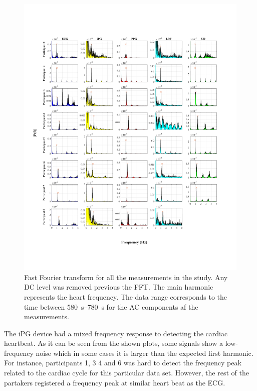 \begin{figure}[!htpb]
	\includegraphics[width=1\textwidth,keepaspectratio,trim={0.75cm 0cm 2cm 2cm},clip]{figure1}    
	\caption[Fequency components of the signals acquired]{Fast Fourier transform for all the measurements in the study. Any DC level was removed previous the FFT. The main harmonic represents the heart frequency. The data range corresponds to the time between \SIrange{580}{780}{\second} for the AC components af the measurements.}
	\label{fig:fft signals}
\end{figure}

The iPG device had a mixed frequency response to detecting the cardiac heartbeat. As it can be seen from the shown plots, some signals show a low-frequency noise which in some cases it is larger than the expected first harmonic. For instance, participants 1, 3 4 and 6 was hard to detect the frequency peak related to the cardiac cycle for this particular data set. However, the rest of the partakers registered a frequency peak at similar heart beat as the ECG. 

